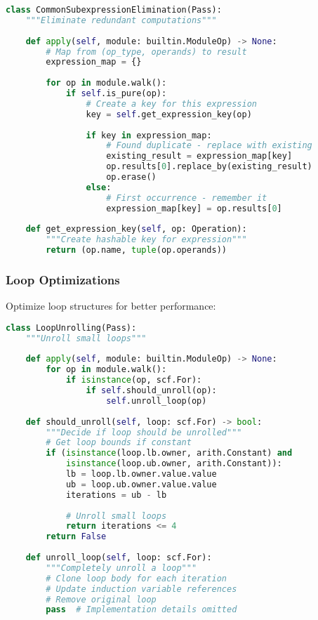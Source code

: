 \documentclass[11pt,a4paper]{article}
\begin{document}
\begin{lstlisting}[language=Python, caption=Common Subexpression Elimination]
class CommonSubexpressionElimination(Pass):
    """Eliminate redundant computations"""
    
    def apply(self, module: builtin.ModuleOp) -> None:
        # Map from (op_type, operands) to result
        expression_map = {}
        
        for op in module.walk():
            if self.is_pure(op):
                # Create a key for this expression
                key = self.get_expression_key(op)
                
                if key in expression_map:
                    # Found duplicate - replace with existing
                    existing_result = expression_map[key]
                    op.results[0].replace_by(existing_result)
                    op.erase()
                else:
                    # First occurrence - remember it
                    expression_map[key] = op.results[0]
    
    def get_expression_key(self, op: Operation):
        """Create hashable key for expression"""
        return (op.name, tuple(op.operands))
\end{lstlisting}

\subsubsection{Loop Optimizations}

Optimize loop structures for better performance:

\begin{lstlisting}[language=Python, caption=Loop Unrolling]
class LoopUnrolling(Pass):
    """Unroll small loops"""
    
    def apply(self, module: builtin.ModuleOp) -> None:
        for op in module.walk():
            if isinstance(op, scf.For):
                if self.should_unroll(op):
                    self.unroll_loop(op)
    
    def should_unroll(self, loop: scf.For) -> bool:
        """Decide if loop should be unrolled"""
        # Get loop bounds if constant
        if (isinstance(loop.lb.owner, arith.Constant) and
            isinstance(loop.ub.owner, arith.Constant)):
            lb = loop.lb.owner.value.value
            ub = loop.ub.owner.value.value
            iterations = ub - lb
            
            # Unroll small loops
            return iterations <= 4
        return False
    
    def unroll_loop(self, loop: scf.For):
        """Completely unroll a loop"""
        # Clone loop body for each iteration
        # Update induction variable references
        # Remove original loop
        pass  # Implementation details omitted
\end{lstlisting}
\end{document}
